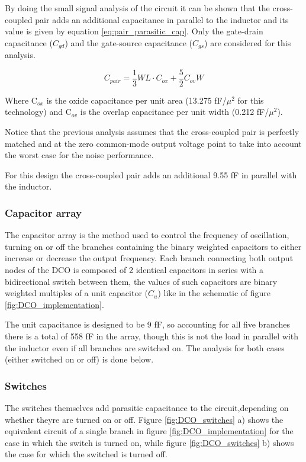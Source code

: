 By doing the small signal analysis of the circuit it can be shown that the cross-coupled pair adds an additional capacitance in parallel to the inductor and its value is given by equation \eqref{eq:pair_parasitic_cap}.
Only the gate-drain capacitance ($C_{gd}$) and the gate-source capacitance ($C_{gs}$) are considered for this analysis.

\begin{equation}
    C_{pair} = \frac{1}{3} W L \cdot C_{ox} + \frac{5}{2} C_{ov} W 
    \label{eq:pair_parasitic_cap}
\end{equation}

Where C$_{ox}$ is the oxide capacitance per unit area (13.275 fF/$\mu^2$ for this technology) and C$_{ov}$ is the overlap capacitance per unit width (0.212 fF/$\mu^2$).

Notice that the previous analysis assumes that the cross-coupled pair is perfectly matched and at the zero common-mode output voltage point to take into account the worst case for the noise performance.

For this design the cross-coupled pair adds an additional 9.55 fF in parallel with the inductor.

\subsubsection{Capacitor array}
The capacitor array is the method used to control the frequency of oscillation, turning on or off the branches containing the binary weighted capacitors to either increase or decrease the output frequency. Each
branch connecting both output nodes of the DCO is composed of 2 identical capacitors in series with a bidirectional switch between them, the values of such capacitors are binary weighted multiples of a unit capacitor
($C_u$) like in the schematic of figure \ref{fig:DCO_implementation}.

The unit capacitance is designed to be 9 fF, so accounting for all five branches there is a total of 558 fF in the array, though this is not the load in parallel with the inductor even if all branches are
switched on. The analysis for both cases (either switched on or off) is done below.

\subsubsection{Switches}
The switches themselves add parasitic capacitance to the circuit,depending on whether theyre are turned on or off. Figure \ref{fig:DCO_switches} a) shows the equivalent circuit of a single branch in figure
\ref{fig:DCO_implementation} for the case in which the switch is turned on, while figure \ref{fig:DCO_switches} b) shows the case for which the switched is turned off.


